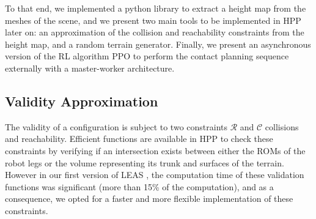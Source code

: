 To that end, we implemented a python library to extract a height map from the meshes of the scene, and we present two main tools to be implemented in HPP later on: an approximation of the collision and reachability constraints from the height map, and a random terrain generator. 
Finally, we present an asynchronous version of the RL algorithm PPO to perform the contact planning sequence externally with a master-worker architecture.

\subsection{Validity Approximation\label{subsub:validity_approximation}}
The validity of a configuration is subject to two constraints $\mathcal{R}$ and $\mathcal{C}$ collisions and reachability.
Efficient functions are available in HPP to check these constraints by verifying if an intersection exists between either the ROMs of the robot legs or the volume representing its trunk and surfaces of the terrain. 
However in our first version of LEAS \cite{LEAS}, the computation time of these validation functions was significant (more than 15\% of the computation), and as a consequence, we opted for a faster and more flexible implementation of these constraints.

